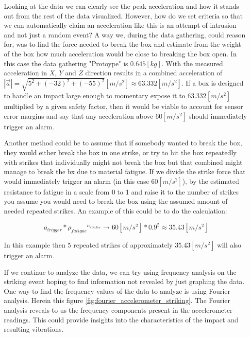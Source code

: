 \documentclass[../main.tex]{subfiles}
\begin{document}
Looking at the data we can clearly see the peak acceleration and how it
stands out from the rest of the data visualized. However,
how do we set criteria so that we can automatically claim
an acceleration like this is an attempt of intrusion and not just a random event? A way we, during the data gathering, could reason for, was to find the force needed to break the box and estimate from the weight of the box how much acceleration would be close to breaking the box open. In this case the data gathering "Protoype" is $0.645 [kg]$. With the measured acceleration in $X$, $Y$ and $Z$ direction results in a combined acceleration of $|\overrightarrow{a}| = \sqrt{5^2+(-32)^2+(-55)^2} [m/s^2] \approx 63.332 [m/s^2]$. If a box is designed to handle an impact large enough to momentary expose it to $63.332 [m/s^2]$ multiplied by a given safety factor, then it would be viable to account for sensor error margins and say that any acceleration above $60 [m/s^2]$ should immediately trigger an alarm.

Another method could be to assume that if somebody wanted to break the box, they would either break the box in one strike, or try to hit the box repeatedly with strikes that individually might not break the box but that combined might manage to break the bx due to material fatigue. If we divide the strike force that would immediately trigger an alarm (in this case $60 [m/s^2]$), by the estimated resistance to fatigue in a scale from 0 to 1 and raise it to the number of strikes you assume you would need to break the box using the assumed amount of needed repeated strikes. An example of this could be to do the calculation:

$$a_{trigger} * {\rho_{fatigue}}^{n_{strikes}} \rightarrow 60 [m/s^2] * 0.9^5 \approx 35.43 [m/s^2] $$

In this example then $5$ repeated strikes of approximately $35.43 [m/s^2]$ will also trigger an alarm.

If we continue to analyze the data, we can try using frequency analysis on the striking event hoping to find information not revealed by just graphing the data. One way to find the frequency values of the data to analyze is using Fourier analysis. Herein this figure \ref{fig:fourier_accelerometer_striking}.
The Fourier analysis reveals to us the frequency components present in the accelerometer readings. This could
provide insights into the characteristics of the
impact and resulting vibrations.
\end{document}

